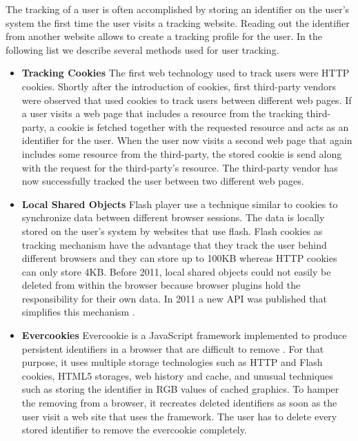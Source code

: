 			The tracking of a user is often accomplished by storing an identifier on the user's system the first time the user visits a tracking website. Reading out the identifier from another website allows to create a tracking profile for the user. In the following list we describe several methods used for user tracking. \\
			
			\begin{itemize}
				\item \textbf{Tracking Cookies} The first web technology used to track users were HTTP cookies. Shortly after the introduction of cookies, first third-party vendors were observed that used cookies to track users between different web pages. %
				If a user visits a web page that includes a resource from the tracking third-party, a cookie is fetched together with the requested resource and acts as an identifier for the user. When the user now visits a second web page that again includes some resource from the third-party, the stored cookie is send along with the request for the third-party's resource. The third-party vendor has now successfully tracked the user between two different web pages.  
				
				\item \textbf{Local Shared Objects} Flash player use a technique similar to cookies to synchronize data between different browser sessions. The data is locally stored on the user's system by websites that use flash. Flash cookies as tracking mechanism have the advantage that they track the user behind different browsers and they can store up to 100KB whereas HTTP cookies can only store 4KB. Before 2011, local shared objects could not easily be deleted from within the browser because browser plugins hold the responsibility for their own data. In 2011 a new API was published that simplifies this mechanism \cite{mozillaWikiClearPrivacyAPI}.
				
				\item \textbf{Evercookies} Evercookie is a JavaScript framework implemented to produce persistent identifiers in a browser that are difficult to remove \cite{evercookie}. For that purpose, it uses multiple storage technologies such as HTTP and Flash cookies, HTML5 storages, web history and cache, and unusual techniques such as storing the identifier in RGB values of cached graphics. To hamper the removing from a browser, it recreates deleted identifiers as soon as the user visit a web site that uses the framework. The user has to delete every stored identifier to remove the evercookie completely. 
				

\end{itemize}
